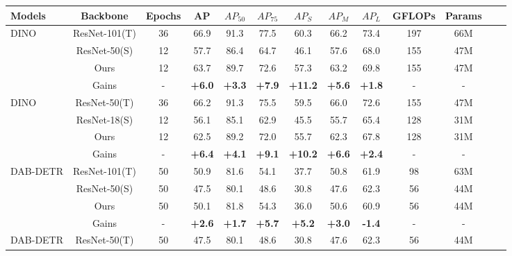 \begin{table*}[h]
    \centering
    \addtolength{\tabcolsep}{-0.2pt}
    \begin{tabular}{lcccccccccccc}
        \toprule
        Models & Backbone & Epochs & AP & $AP_{50}$ & $AP_{75}$ & $AP_S$ & $AP_M$ & $AP_L$ & GFLOPs & Params \\
        \midrule
        \multirow{4}{*}{DINO} & ResNet-101(T) & 36 & 66.9 & 91.3 & 77.5 & 60.3 & 66.2 & 73.4 & 197 & 66M \\
         & ResNet-50(S) & 12 & 57.7 & 86.4 & 64.7 & 46.1 & 57.6 & 68.0 & 155 & 47M \\
         & Ours & 12 & 63.7 & 89.7 & 72.6 & 57.3 & 63.2 & 69.8 & 155 & 47M \\
         & Gains & - & \textbf{+6.0} & \textbf{+3.3} & \textbf{+7.9} & \textbf{+11.2} & \textbf{+5.6} & \textbf{+1.8} & - & - \\
        \midrule
        \multirow{4}{*}{DINO} & ResNet-50(T) & 36 & 66.2 & 91.3 & 75.5 & 59.5 & 66.0 & 72.6 & 155 & 47M \\
         & ResNet-18(S) & 12 & 56.1 & 85.1 & 62.9 & 45.5 & 55.7 & 65.4 & 128 & 31M\\
         & Ours & 12 & 62.5 & 89.2 & 72.0 & 55.7 & 62.3 & 67.8 & 128 & 31M \\
         & Gains & - & \textbf{+6.4} & \textbf{+4.1} & \textbf{+9.1} & \textbf{+10.2} & \textbf{+6.6} & \textbf{+2.4} & - & - \\
        \midrule
        \multirow{4}{*}{DAB-DETR} & ResNet-101(T) & 50 & 50.9 & 81.6 & 54.1 & 37.7 & 50.8 & 61.9 & 98 & 63M \\
         & ResNet-50(S) & 50 & 47.5 & 80.1 & 48.6 & 30.8 & 47.6 & 62.3 & 56 & 44M \\
         & Ours & 50 & 50.1 & 81.8 & 54.3 & 36.0 & 50.6 & 60.9 & 56 & 44M \\
         & Gains & - & \textbf{+2.6} & \textbf{+1.7} & \textbf{+5.7} & \textbf{+5.2} & \textbf{+3.0} & \textbf{-1.4} & - & - \\
        \midrule
        \multirow{4}{*}{DAB-DETR} & ResNet-50(T) & 50 & 47.5 & 80.1 & 48.6 & 30.8 & 47.6 & 62.3 & 56 & 44M \\

\end{tabular}
\end{table*}
